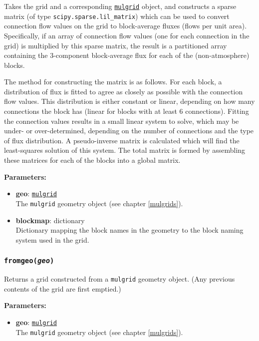 Takes the grid and a corresponding \hyperref[mulgrids]{\texttt{mulgrid}} object, and constructs a sparse matrix (of type \texttt{scipy.sparse.lil\_matrix}) which can be used to convert connection flow values on the grid to block-average fluxes (flows per unit area).  Specifically, if an array of connection flow values (one for each connection in the grid) is multiplied by this sparse matrix, the result is a partitioned array containing the 3-component block-average flux for each of the (non-atmosphere) blocks.

The method for constructing the matrix is as follows.  For each block, a distribution of flux is fitted to agree as closely as possible with the connection flow values.  This distribution is either constant or linear, depending on how many connections the block has (linear for blocks with at least 6 connections).  Fitting the connection values results in a small linear system to solve, which may be under- or over-determined, depending on the number of connections and the type of flux distribution.  A pseudo-inverse matrix is calculated which will find the least-squares solution of this system.  The total matrix is formed by assembling these matrices for each of the blocks into a global matrix.

\textbf{Parameters:}
\begin{itemize}
\item \textbf{geo}: \hyperref[mulgrids]{\texttt{mulgrid}}\\
  The \texttt{mulgrid} geometry object (see chapter \ref{mulgrids}).
\item \textbf{blockmap}: dictionary\\
  Dictionary mapping the block names in the geometry to the block naming system used in the grid.
\end{itemize}

\begin{snugshade}
\subsubsection{\texttt{fromgeo(\emph{geo})}}
\end{snugshade}
\label{sec:t2grid:fromgeo}

Returns a grid constructed from a \texttt{mulgrid} geometry object.  (Any previous contents of the grid are first emptied.)

\textbf{Parameters:}
\begin{itemize}
\item \textbf{geo}: \hyperref[mulgrids]{\texttt{mulgrid}}\\
  The \texttt{mulgrid} geometry object (see chapter \ref{mulgrids}).
\end{itemize}


